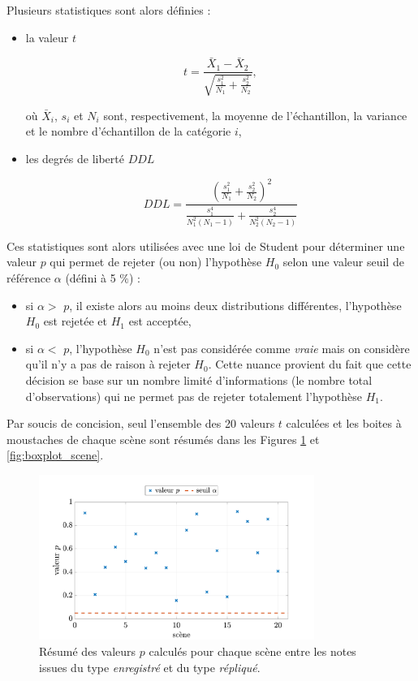 Plusieurs statistiques sont alors définies :
\begin{itemize}
\item la valeur $t$

\begin{equation}
t = \frac{\bar{X}_1-\bar{X}_2}{\sqrt{\frac{s_1^2}{N_1}+\frac{s_2^2}{N_2}}},
\end{equation}

où $\bar{X}_i$, $s_i$ et $N_i$ sont, respectivement, la moyenne de l'échantillon, la variance et le nombre d'échantillon de la catégorie $i$,
\item les degrés de liberté $DDL$

\begin{equation}
DDL = \frac{\left(\frac{s_1^2}{N_1}+\frac{s_2^2}{N_2} \right)^2}{\frac{s_1^4}{N_1^2(N_1-1)}+\frac{s_2^4}{N_2^2(N_2-1)}}
\end{equation}

\end{itemize}

Ces statistiques sont alors utilisées avec une loi de Student pour déterminer une valeur $p$ qui permet de rejeter (ou non) l'hypothèse $H_0$ selon une valeur seuil de référence $\alpha$ (défini à 5 $\%$) :

\begin{itemize}
\item si $\alpha >$ $p$, il existe alors au moins deux distributions différentes, l'hypothèse $H_0$ est rejetée et $H_1$ est acceptée,
\item si $\alpha <$ $p$, l'hypothèse $H_0$ n'est pas considérée comme \textit{vraie} mais on considère qu'il n'y a pas de raison à rejeter $H_0$. Cette nuance provient du fait que cette décision se base sur un nombre limité d'informations (le nombre total d'observations) qui ne permet pas de rejeter totalement l'hypothèse $H_1$.\\
\end{itemize}

Par soucis de concision, seul l'ensemble des 20 valeurs $t$ calculées et les boites à moustaches de chaque scène sont résumés dans les Figures \ref{fig:test-student} et \ref{fig:boxplot_scene}.

\begin{figure}[ht]
\centering
\includegraphics[width = 0.8\textwidth]{./figures/test_perceptif/t-value-student.pdf}
\caption{Résumé des valeurs $p$ calculés pour chaque scène entre les notes issues du type \textit{enregistré} et du type \textit{répliqué}.}\label{fig:test-student}
\end{figure}

